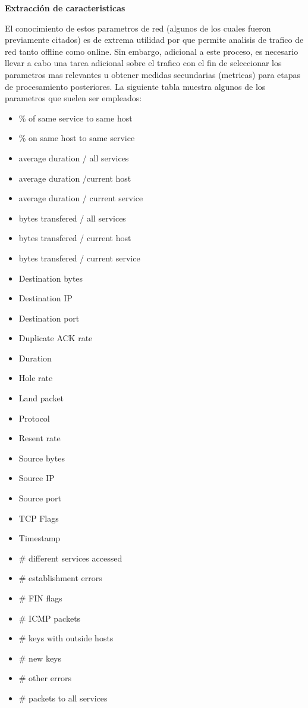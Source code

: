 \documentclass[12pt]{article}
\begin{document}
\textbf{Extracción de caracteristicas}

El conocimiento de estos parametros de red (algunos de los cuales fueron previamente citados) es de extrema utilidad por que permite analisis de trafico de red tanto offline como online. Sin embargo, adicional a este proceso, es necesario llevar a cabo una tarea adicional sobre el trafico con el fin de seleccionar los parametros mas relevantes u obtener medidas secundarias (metricas) para etapas de procesamiento posteriores. La siguiente tabla muestra algunos de los parametros que suelen ser empleados:

\begin{itemize}
\item \% of same service to same host
\item \% on same host to same service
\item average duration / all services
\item average duration /current host
\item average duration / current service
\item bytes transfered / all services
\item bytes transfered / current host
\item bytes transfered / current service
\item Destination bytes
\item Destination IP
\item Destination port
\item Duplicate ACK rate
\item Duration
\item Hole rate
\item Land packet
\item Protocol
\item Resent rate
\item Source bytes
\item Source IP
\item Source port
\item TCP Flags
\item Timestamp
\item \# different services accessed
\item \# establishment errors
\item \# FIN flags
\item \# ICMP packets
\item \# keys with outside hosts
\item \# new keys
\item \# other errors
\item \# packets to all services

\end{itemize}
\end{document}
